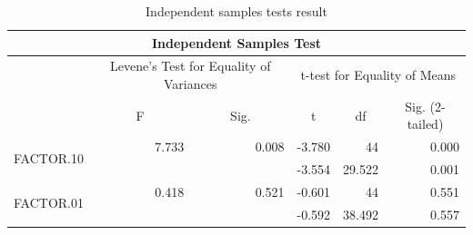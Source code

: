 \documentclass[a4paper]{article}
\begin{document}
\begin{table}[H]
\centering
\caption{Independent samples tests result}
\label{tab:location}
\begin{tabular}{|l|c|c|r|r|r|} 
\hline
\multicolumn{6}{|c|}{Independent Samples Test}                                                                                                                                                                                          \\ 
\hline
                           & \multicolumn{2}{c|}{Levene's Test for Equality of Variances} & \multicolumn{3}{c|}{t-test for Equality of Means}                                                                                           \\ 
\hline
                           & \multirow{2}{*}{F}         & \multirow{2}{*}{Sig.}           & \multicolumn{1}{c|}{\multirow{2}{*}{t}} & \multicolumn{1}{c|}{\multirow{2}{*}{df}} & \multicolumn{1}{c|}{\multirow{2}{*}{Sig. (2-tailed)}}  \\ 
\cline{1-1}
                           &                            &                                 & \multicolumn{1}{c|}{}                   & \multicolumn{1}{c|}{}                    & \multicolumn{1}{c|}{}                                  \\ 
\hline
\multirow{2}{*}{FACTOR.10} & \multicolumn{1}{r|}{7.733} & \multicolumn{1}{r|}{0.008}      & -3.780                                  & 44                                       & 0.000                                                  \\ 
\cline{2-6}
                           & \multicolumn{1}{l|}{~}     & \multicolumn{1}{l|}{~}          & -3.554                                  & 29.522                                   & 0.001                                                  \\ 
\hline
\multirow{2}{*}{FACTOR.01} & \multicolumn{1}{r|}{0.418} & \multicolumn{1}{r|}{0.521}      & -0.601                                  & 44                                       & 0.551                                                  \\ 
\cline{2-6}
                           & \multicolumn{1}{l|}{~}     & \multicolumn{1}{l|}{~}          & -0.592                                  & 38.492                                   & 0.557                                                  \\
\hline
\end{tabular}
\end{table}
\end{document}
